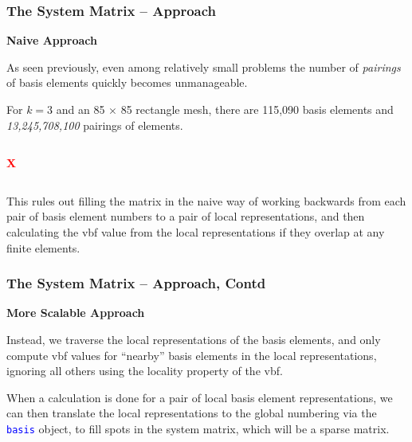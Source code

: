\documentclass[compress]{beamer}
\begin{document}
\begin{frame}
  \frametitle{The System Matrix -- Approach}
  \textbf{Naive Approach}

  As seen previously, even among relatively small problems the number of \emph{pairings} of basis elements quickly becomes unmanageable.
  
  \pause
  \vspace{.15cm}
  \uncover<+-> {
  For $k=3$ and an 85 $\times$ 85 rectangle mesh, there are 115,090 basis elements and \emph{13,245,708,100} pairings of elements.

  \vspace{.15cm}
  \uncover<+-> {
    \begin{columns}
        \textbf{\textcolor{red}{\Large{X}}}
    \end{columns}
  
  \vspace{.15cm}
  This rules out filling the matrix in the naive way of working backwards from each pair of basis element numbers to a pair of local
  representations, and then calculating the vbf value from the local representations if they overlap at any finite elements.
  }}
\end{frame}

\begin{frame}
  \frametitle{The System Matrix -- Approach, Contd}
  \textbf{More Scalable Approach}

  \vspace{.15cm}
  Instead, we traverse the local representations of the basis elements, and only compute vbf values for ``nearby'' basis  
  elements in the local representations, ignoring all others using the locality property of the vbf.
  
  \pause
  \vspace{.15cm}
  When a calculation is done for a pair of local basis element representations, we can then translate the local representations
  to the global numbering via the \texttt{\textcolor{blue}{basis}} object, to fill spots in the system matrix, which will be a
  sparse matrix.
\end{frame}
\end{document}
